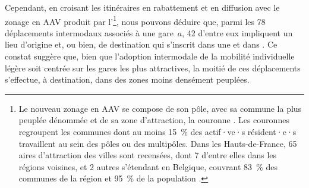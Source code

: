 \begin{refsegment}
Cependant, en croisant les itinéraires en rabattement et en diffusion avec le zonage en \acrfull{AAV} produit par l'\textcolor{blue}{\textcite{insee_nouveau_2020}}\footnote{
    Le nouveau zonage en \acrfull{AAV} se compose de son pôle, avec sa commune la plus peuplée dénommée  et de sa zone d'attraction, la couronne \textcolor{blue}{\autocite{insee_nouveau_2020}}. Les couronnes regroupent les communes dont au moins 15~\% des actif·ve·s résident·e·s travaillent au sein des pôles ou des multipôles.
    Dans les Hauts-de-France, 65 aires d'attraction des villes sont recensées, dont 7 d'entre elles dans les régions voisines, et 2 autres s'étendant en Belgique, couvrant 83~\% des communes de la région et 95~\% de la population \textcolor{blue}{\autocite{insee_plus_2020}}.
}, nous pouvons déduire que, parmi les 78 déplacements intermodaux associés à une gare~\(a\), 42 d'entre eux impliquent un lieu d'origine et, ou bien, de destination qui s'inscrit dans une  et dans . Ce constat suggère que, bien que l'adoption intermodale de la mobilité individuelle légère soit centrée sur les gares les plus attractives, la moitié de ces déplacements s'effectue, à destination, dans des zones moins densément peuplées.%


\end{refsegment}
